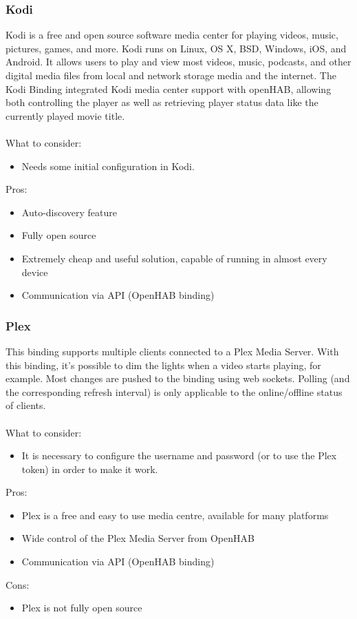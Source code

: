 \subsubsection{Kodi}
Kodi is a free and open source software media center for playing videos, music, pictures, games, and more. Kodi runs on Linux, OS X,
BSD, Windows, iOS, and Android. It allows users to play and view most videos, music, podcasts, and other digital media files from local
and network storage media and the internet.
The Kodi Binding integrated Kodi media center support with openHAB, allowing both controlling the player as well as retrieving player
status data like the currently played movie title.\\~\\
What to consider:
\begin{itemize}
	\item Needs some initial configuration in Kodi.
\end{itemize}
Pros:
\begin{itemize}
	\item Auto-discovery feature
	\item Fully open source 
	\item Extremely cheap and useful solution, capable of running in almost every device
	\item Communication via API (OpenHAB binding)
\end{itemize}

\subsubsection{Plex}
This binding supports multiple clients connected to a Plex Media Server. With this binding, it’s possible to dim the lights when a video
starts playing, for example.
Most changes are pushed to the binding using web sockets. Polling (and the corresponding refresh interval) is only applicable to the 
online/offline status of clients.\\~\\
What to consider:
\begin{itemize}
	\item It is necessary to configure the username and password (or to use the Plex token) in order to make it work.
\end{itemize}
Pros:
\begin{itemize}
	\item Plex is a free and easy to use media centre, available for many platforms
	\item Wide control of the Plex Media Server from OpenHAB
	\item Communication via API (OpenHAB binding)
\end{itemize}
Cons:
\begin{itemize}
	\item Plex is not fully open source
\end{itemize}
	
